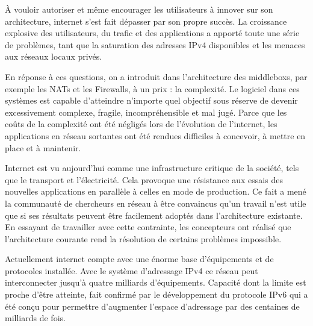 À vouloir autoriser et même encourager les utilisateurs à innover sur son architecture, internet s'est fait dépasser par son propre succès. La croissance explosive des utilisateurs, du trafic et des applications a apporté toute une série de problèmes, 
tant que la saturation des adresses IPv4 disponibles et les menaces aux réseaux locaux privés. 

\par
En réponse à ces questions, on a introduit dans l'architecture des \glspl{middlebox}, par exemple les NATs et les Firewalls, à un prix : la complexité. Le logiciel dans ces systèmes est capable d'atteindre n'importe quel objectif sous réserve de devenir excessivement complexe, fragile, incompréhensible et mal jugé. Parce que les coûts de la complexité ont été négligés lors de l'évolution de l'internet, les applications en réseau sortantes ont été rendues difficiles à concevoir, à mettre en place et à maintenir. \cite{InternetEvolutionRoleSoftwareEngineeringRealInternet}

Internet est vu aujourd'hui comme une infrastructure critique de la société, tels que le transport et l'électricité.  Cela provoque une résistance aux essais des nouvelles applications en parallèle à celles en mode de production. 
Ce fait a mené la communauté de chercheurs en réseau à être convaincus qu'un travail n'est utile que si ses résultats peuvent être facilement adoptés dans l'architecture existante. En essayant de travailler avec cette contrainte, les concepteurs ont réalisé que l'architecture courante rend la résolution de certains problèmes impossible. \cite{OpenFlowStanfordOssification} \cite{SurveySDNIntro}

Actuellement internet compte avec une énorme base d'équipements et de protocoles installée. Avec le système d'adressage IPv4 ce réseau peut interconnecter jusqu'à quatre milliards d'équipements. Capacité dont la limite est proche d'être atteinte, fait confirmé par le développement du protocole IPv6 qui a été conçu pour permettre d'augmenter l'espace d'adressage par des centaines de milliards de fois. \cite{ICANNIPv6Important} 


